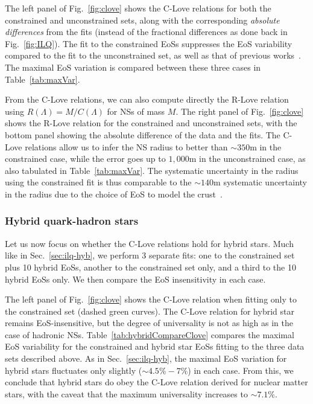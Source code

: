 \documentclass[prd,twocolumn,nofootinbib,superscriptaddress,amsmath,amssymb]{revtex4-1}
\begin{document}
The left panel of Fig.~\ref{fig:clove} shows the C-Love relations for both the constrained and unconstrained sets, along with the corresponding \emph{absolute differences} from the fits (instead of the fractional differences as done back in Fig.~\ref{fig:ILQ}). The fit to the constrained EoSs suppresses the EoS variability compared to the fit to the unconstrained set, as well as that of previous works~\cite{Yagi:binLove}. The maximal EoS variation is compared between these three cases in Table~\ref{tab:maxVar}.

From the C-Love relations, we can also compute directly the R-Love relation using $R(\Lambda)=M/C(\Lambda)$ for NSs of mass $M$. The right panel of Fig.~\ref{fig:clove} shows the R-Love relation for the constrained and unconstrained sets, with the bottom panel showing the absolute difference of the data and the fits. The C-Love relations allow us to infer the NS radius to better than $\sim 350 \textrm{m} $ in the constrained case, while the error goes up to $1,000 \textrm{m}$ in the unconstrained case, as also tabulated in Table~\ref{tab:maxVar}. The systematic uncertainty in the radius using the constrained fit is thus comparable to the $\sim 140\textrm{m}$ systematic uncertainty in the radius due to the choice of EoS to model the crust~\cite{Gamba:2019kwu}. 


\subsubsection{Hybrid quark-hadron stars}
\label{sec:clove-hyb}

Let us now focus on whether the C-Love relations hold for hybrid stars. Much like in Sec.~\ref{sec:ilq-hyb}, we perform 3 separate fits: one to the constrained set plus 10 hybrid EoSs, another to the constrained set only, and a third to the 10 hybrid EoSs only. We then compare the EoS insensitivity in each case.

The left panel of Fig.~\ref{fig:clove} shows the C-Love relation when fitting only to the constrained set (dashed green curves). The C-Love relation for hybrid star remains EoS-insensitive, but the degree of universality is not as high as in the case of hadronic NSs. Table~\ref{tab:hybridCompareClove} compares the maximal EoS variability for the constrained and hybrid star EoSs fitting to the three data sets described above. As in Sec.~\ref{sec:ilq-hyb}, the maximal EoS variation for hybrid stars fluctuates only slightly ($\sim 4.5\% - 7\%$) in each case. From this, we conclude that hybrid stars do obey the C-Love relation derived for nuclear matter stars, with the caveat that the maximum universality increases to $\sim 7.1\%$.
\end{document}
